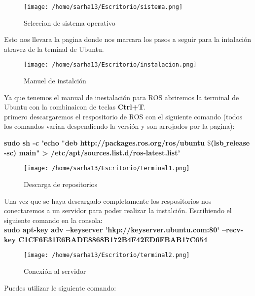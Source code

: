\documentclass[letter,openrigth,12pt,spanish]{report}
\begin{document}
\begin{figure}[htp]
\centering
\texttt{[image: /home/sarha13/Escritorio/sistema.png]}
\caption{Seleccion de sistema operativo}
\label{Figura 3.}
\end{figure}

Esto nos llevara la pagina donde nos marcara los pasos a seguir para la intalaci\'on atravez de la teminal de Ubuntu.\\

\begin{figure}[htp]
\centering
\texttt{[image: /home/sarha13/Escritorio/instalacion.png]}
\caption{Manuel de instalci\'on }
\label{Figura 4.}
\end{figure}

Ya que tenemos el manual de inestalaci\'on para ROS abriremos la terminal de Ubuntu con la combinaicon de teclas \textbf{Ctrl+T}.\\

primero descargaremos el respositorio de ROS con el siguiente comando (todos los comandos varian despendiendo la versi\'on y son arrojados por la pagina):\\

\begin{center}
\textbf{sudo sh -c 'echo "deb http://packages.ros.org/ros/ubuntu $\$$(lsb\underline{ }release -sc) main" > /etc/apt/sources.list.d/ros-latest.list'}\\
\end{center}

\begin{figure}[htp]
\centering
\texttt{[image: /home/sarha13/Escritorio/terminal1.png]}
\caption{Descarga de repositorios}
\label{Figura 5.}
\end{figure}

Una vez que se haya descargado completamente los respositorios nos conectaremos a un servidor para poder realizar la instalci\'on. Escribiendo el siguiente comando en la consola:\\

\textbf{sudo apt-key adv --keyserver 'hkp://keyserver.ubuntu.com:80' --recv-key C1CF6E31E6BADE8868B172B4F42ED6FBAB17C654}

\begin{figure}[htp]
\centering
\texttt{[image: /home/sarha13/Escritorio/terminal2.png]}
\caption{Conexi\'on al servidor}
\label{Figura 6.}
\end{figure}

Puedes utilizar le siguiente comando:\\
\end{document}
